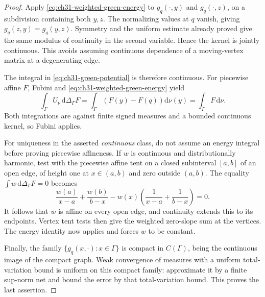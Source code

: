 \begin{proof}
Apply \eqref{eq:ch31-weighted-green-energy} to
\(g_q(\cdot,y)\) and \(g_q(\cdot,z)\), on a subdivision containing
both \(y,z\).  The normalizing values at \(q\) vanish, giving
\(g_q(z,y)=g_q(y,z)\).  Symmetry and the uniform estimate already
proved give the same modulus of continuity in the second variable.
Hence the kernel is jointly continuous.  This avoids assuming
continuous dependence of a moving-vertex matrix at a degenerating edge.

The integral in \eqref{eq:ch31-green-potential} is therefore
continuous.  For piecewise affine \(F\), Fubini and
\eqref{eq:ch31-weighted-green-energy} yield
\[
 \int_\Gamma U_\nu\,\mathrm d\Delta_\Gamma F
  =\int_\Gamma\left(F(y)-F(q)\right)\mathrm d\nu(y)
  =\int_\Gamma F\,\mathrm d\nu.
\]
Both integrations are against finite signed measures and a bounded
continuous kernel, so Fubini applies.

For uniqueness in the asserted \emph{continuous} class, do not assume
an energy integral before proving piecewise affineness.  If \(w\) is
continuous and distributionally harmonic, test with the piecewise
affine tent on a closed subinterval \([a,b]\) of an open edge, of
height one at \(x\in(a,b)\) and zero outside \((a,b)\).
The equality \(\int w\,\mathrm d\Delta_\Gamma F=0\) becomes
\[
 \frac{w(a)}{x-a}+\frac{w(b)}{b-x}
       -w(x)\left(\frac1{x-a}+\frac1{b-x}\right)=0.
\]
It follows that \(w\) is affine on every open edge, and continuity
extends this to its endpoints.  Vertex tent tests then give the
weighted zero-slope sum at the vertices.  The energy identity now
applies and forces \(w\) to be constant.

Finally, the family \(\{g_q(x,\cdot):x\in \Gamma\}\) is compact in
\(C(\Gamma)\), being the continuous image of the compact graph.  Weak
convergence of measures with a uniform total-variation bound is uniform
on this compact family: approximate it by a finite sup-norm net and
bound the error by that total-variation bound.  This proves the last
assertion.
\end{proof}



